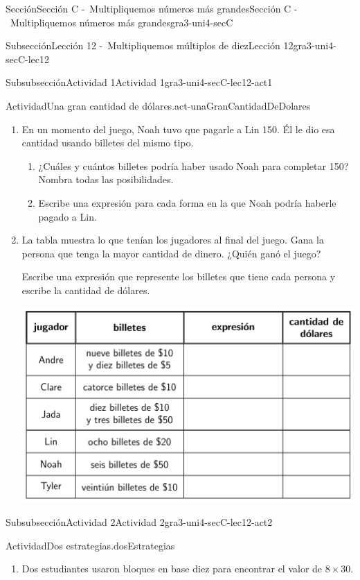 \documentclass[twoside,10pt,]{article}
\begin{document}
\begin{sectionptx}{Sección}{Sección C -~Multipliquemos números más grandes}{}{Sección C -~Multipliquemos números más grandes}{}{}{gra3-uni4-secC}
\begin{subsectionptx}{Subsección}{Lección 12 -~Multipliquemos múltiplos de diez}{}{Lección 12}{}{}{gra3-uni4-secC-lec12}
\begin{subsubsectionptx}{Subsubsección}{Actividad 1}{}{Actividad 1}{}{}{gra3-uni4-secC-lec12-act1}
\begin{activity}{Actividad}{Una gran cantidad de dólares.}{act-unaGranCantidadDeDolares}
\begin{enumerate}
\begin{image}{0}{1}{0}{}
\end{image}%
\item{}En un momento del juego, Noah tuvo que pagarle a Lin \textdollar{}150. Él le dio esa cantidad usando billetes del mismo tipo.%
%
\begin{enumerate}
\item{}¿Cuáles y cuántos billetes podría haber usado Noah para completar \textdollar{}150? Nombra todas las posibilidades.%
\item{}Escribe una expresión para cada forma en la que Noah podría haberle pagado a Lin.%
\end{enumerate}
\item{}La tabla muestra lo que tenían los jugadores al final del juego. Gana la persona que tenga la mayor cantidad de dinero. ¿Quién ganó el juego?%
\par
Escribe una expresión que represente los billetes que tiene cada persona y escribe la cantidad de dólares.%
\begin{image}{0}{1}{0}{}%
\includegraphics[width=\linewidth]{external/tikz-source/unaGranCantidadDeDolares-tab2.pdf}
\end{image}%
\end{enumerate}
\end{activity}%
\end{subsubsectionptx}
%
%
\typeout{************************************************}
\typeout{************************************************}
%
\begin{subsubsectionptx}{Subsubsección}{Actividad 2}{}{Actividad 2}{}{}{gra3-uni4-secC-lec12-act2}
\begin{activity}{Actividad}{Dos estrategias.}{dosEstrategias}%
%
\begin{enumerate}
\item{}Dos estudiantes usaron bloques en base diez para encontrar el valor de \(8\times 30\).%

\end{enumerate}
\end{activity}
\end{subsubsectionptx}
\end{subsectionptx}
\end{sectionptx}
\end{document}
